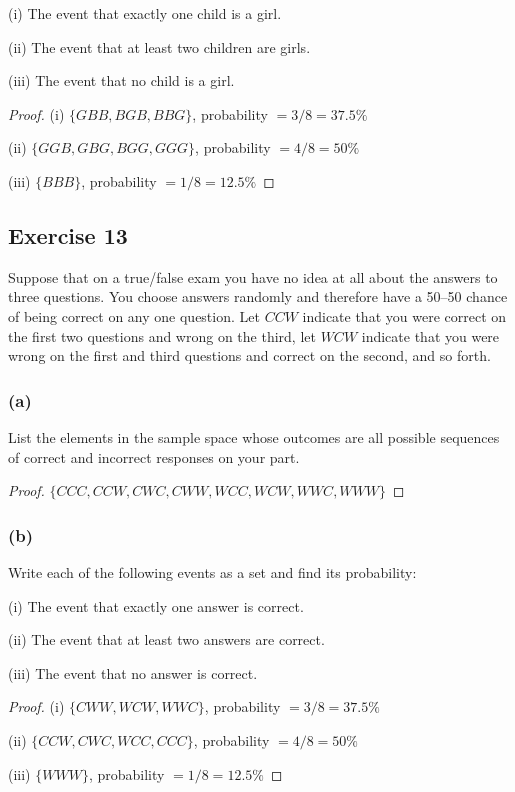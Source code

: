 \documentclass[14pt]{extarticle}
\begin{document}
(i) The event that exactly one child is a girl.

(ii) The event that at least two children are girls.

(iii) The event that no child is a girl.

\begin{proof}
(i) \(\{GBB, BGB, BBG\}\), probability \(= 3/8 = 37.5\%\)

(ii) \(\{GGB, GBG, BGG, GGG\}\), probability \(= 4/8 = 50\%\)

(iii) \(\{BBB\}\), probability \(= 1/8 = 12.5\%\)
\end{proof}

\subsection{Exercise 13}
Suppose that on a true/false exam you have no idea at all about the answers to three questions. You choose answers 
randomly and therefore have a 50–50 chance of being correct on any one question. Let \(CCW\) indicate that you were 
correct on the first two questions and wrong on the third, let \(WCW\) indicate that you were wrong on the first and 
third questions and correct on the second, and so forth.

\subsubsection{(a)}
List the elements in the sample space whose outcomes are all possible sequences of correct and incorrect responses 
on your part.

\begin{proof}
\(\{CCC, CCW, CWC, CWW, WCC, WCW, WWC, WWW\}\)
\end{proof}

\subsubsection{(b)}
Write each of the following events as a set and find its probability:

(i) The event that exactly one answer is correct.

(ii) The event that at least two answers are correct.

(iii) The event that no answer is correct.

\begin{proof}
(i) \(\{CWW, WCW, WWC\}\), probability \(= 3/8 = 37.5\%\)

(ii) \(\{CCW, CWC, WCC, CCC\}\), probability \(= 4/8 = 50\%\)

(iii) \(\{WWW\}\), probability \(= 1/8 = 12.5\%\)
\end{proof}
\end{document}
